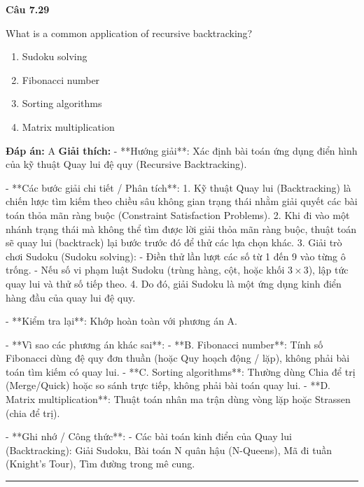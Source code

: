 \documentclass[11pt,a4paper]{article}
\newenvironment{question}[1]{%
  \par\vspace{1em}\noindent\textbf{\large Câu #1}\par\vspace{0.4em}
}{%
  \par\vspace{1em}\hrule\vspace{0.6em}
}
\newenvironment{choices}{%
  \begin{enumerate}[label=\textbf{\Alph*.},leftmargin=2.2em,itemsep=2pt,topsep=3pt]
}{%
  \end{enumerate}
}
\newcommand{\choice}{\item}
\begin{document}
\begin{question}{7.29}
What is a common application of recursive backtracking?
\begin{choices}
\choice Sudoku solving
\choice Fibonacci number
\choice Sorting algorithms
\choice Matrix multiplication
\end{choices}
\textbf{Đáp án:} A
\textbf{Giải thích:} - **Hướng giải**:
  Xác định bài toán ứng dụng điển hình của kỹ thuật Quay lui đệ quy (Recursive Backtracking).

- **Các bước giải chi tiết / Phân tích**:
  1. Kỹ thuật Quay lui (Backtracking) là chiến lược tìm kiếm theo chiều sâu không gian trạng thái nhằm giải quyết các bài toán thỏa mãn ràng buộc (Constraint Satisfaction Problems).
  2. Khi đi vào một nhánh trạng thái mà không thể tìm được lời giải thỏa mãn ràng buộc, thuật toán sẽ quay lui (backtrack) lại bước trước đó để thử các lựa chọn khác.
  3. Giải trò chơi Sudoku (Sudoku solving):
     - Điền thử lần lượt các số từ 1 đến 9 vào từng ô trống.
     - Nếu số vi phạm luật Sudoku (trùng hàng, cột, hoặc khối \(3 \times 3\)), lập tức quay lui và thử số tiếp theo.
  4. Do đó, giải Sudoku là một ứng dụng kinh điển hàng đầu của quay lui đệ quy.

- **Kiểm tra lại**:
  Khớp hoàn toàn với phương án A.

- **Vì sao các phương án khác sai**:
  - **B. Fibonacci number**: Tính số Fibonacci dùng đệ quy đơn thuần (hoặc Quy hoạch động / lặp), không phải bài toán tìm kiếm có quay lui.
  - **C. Sorting algorithms**: Thường dùng Chia để trị (Merge/Quick) hoặc so sánh trực tiếp, không phải bài toán quay lui.
  - **D. Matrix multiplication**: Thuật toán nhân ma trận dùng vòng lặp hoặc Strassen (chia để trị).

- **Ghi nhớ / Công thức**:
  - Các bài toán kinh điển của Quay lui (Backtracking): Giải Sudoku, Bài toán N quân hậu (N-Queens), Mã đi tuần (Knight's Tour), Tìm đường trong mê cung.
\end{question}
\end{document}

